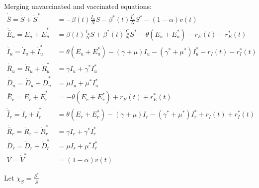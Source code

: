 \documentclass[11pt]{article} %
\begin{document}
\noindent
Merging unvaccinated and vaccinated equations:
%
\begin{align}
\dot{\bar{S}} = \dot{S} + \dot{S}^* &= -\beta(t) \frac{I_u}{N} S -\beta^*(t) \frac{I^*_u}{N} S^* - (1-\alpha) v(t)  \\
\dot{\bar{E}}_u  = \dot{E}_u + \dot{E}^*_u &= \beta(t) \frac{I_u}{N} S + \beta^*(t) \frac{I^*_u}{N} S^* - \theta (E_u + E^*_u) - r_E(t) - r^*_E(t) \\
\dot{\bar{I}}_u = \dot{I}_u + \dot{I}^*_u &= \theta (E_u + E^*_u) - (\gamma + \mu) I_u - (\gamma^* + \mu^*) I^*_u - r_I(t) - r^*_I(t) \\
\dot{\bar{R}}_u = \dot{R}_u + \dot{R}^*_u &= \gamma I_u + \gamma^* I^*_u \\
\dot{\bar{D}}_u = \dot{D}_u + \dot{D}^*_u &= \mu I_u + \mu^* I^*_u \\
\dot{\bar{E}}_r = \dot{E}_r + \dot{E}^*_r &= - \theta (E_r + E^*_r) + r_E(t) + r^*_E(t) \\
\dot{\bar{I}}_r = \dot{I}_r + \dot{I}^*_r &= \theta (E_r + E^*_r) - (\gamma + \mu) I_r - (\gamma^* + \mu^*) I^*_r + r_I(t) + r^*_I(t) \\
\dot{\bar{R}}_r = \dot{R}_r + \dot{R}^*_r &= \gamma I_r + \gamma^* I^*_r \\
\dot{\bar{D}}_r  = \dot{D}_r + \dot{D}^*_r &= \mu I_r + \mu^* I^*_r \\
\dot{\bar{V}} = \dot{V}^* &= (1 - \alpha) v(t)
\end{align}

\noindent
Let $\chi_S = \frac{S^*}{\bar{S}}$
%
%
\end{document}
